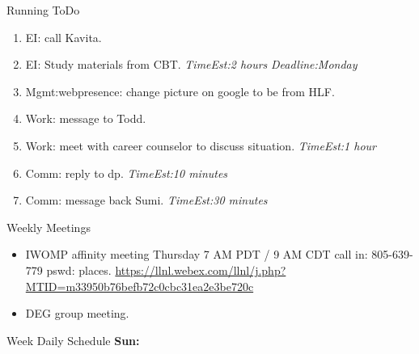 \documentclass[serif, mathserif, final]{beamer}
\newcommand{\te}[1]{\textit{TimeEst:}\textit{#1}}
\newcommand{\dl}[1]{\textit{Deadline:}\textit{#1}}
\begin{document}
\begin{frame}
\begin{columns}
\begin{column}{0.5\linewidth}
\begin{block}{Running ToDo}
\begin{enumerate}
{      I used gcc version 4.8.5 instead of gcc version 4.2.1 for my gcc
      compiler:
      
      Viveks-MacBook-Air:charm vivekkale: gcc --version
      gcc (MacPorts gcc48 4.8.5_0) 4.8.5
      Copyright (C) 2015 Free Software Foundation, Inc.
      This is free software; see the source for copying conditions.  There
      is NO warranty; not even for MERCHANTABILITY or FITNESS FOR A PARTICULAR
      PURPOSE.
      } 


    \item \tiny EI: call Kavita.
    \item \tiny EI: Study materials from CBT.  \te{2 hours}
      \dl{Monday} 

    \item \tiny Mgmt:webpresence: change picture on google to be from
      HLF. 
      
    \item \tiny Work: message to Todd. 

    \item \tiny Work: meet with career counselor to discuss situation. \te{1
      hour}
    \item \tiny Comm: reply to dp. \te{10 minutes}


    \item \tiny Comm: message back Sumi.  \te{30 minutes} 
 
    \end{enumerate}
  \end{block}
 

  \begin{block}{Weekly Meetings}
    \begin{itemize} 
    \item \tiny IWOMP affinity meeting Thursday 7 AM PDT / 9 AM
      CDT call in: 805-639-779 pswd: places. 
      \url{https://llnl.webex.com/llnl/j.php?MTID=m33950b76befb72c0cbc31ea2e3be720c}
    \item \tiny DEG group meeting.  
    \end{itemize}
  \end{block} 
      
  \begin{block}{Week Daily Schedule} 
    {\bf Sun:} 
  \end{block} 


\end{column}
\end{columns}
\end{frame}
\end{document}
